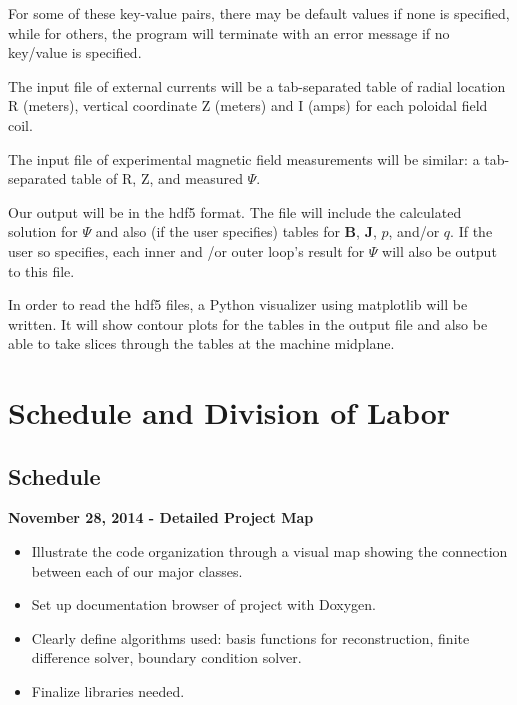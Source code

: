 \documentclass[paper=letter, fontsize=11pt]{scrartcl} %
\begin{document}
For some of these key-value pairs, there may be default values if none is specified, while for others, the program will terminate with an error message if no key/value is specified.

The input file of external currents will be a tab-separated table of radial location R (meters), vertical coordinate Z (meters) and I (amps) for each poloidal field coil.

The input file of experimental magnetic field measurements will be similar: a tab-separated table of R, Z, and measured $\Psi$.

Our output will be in the hdf5 format. The file will include the calculated solution for $\Psi$ and also (if the user specifies) tables for $\mathbf{B}$, $\mathbf{J}$, $p$, and/or $q$. If the user so specifies, each inner and /or outer loop's result for $\Psi$ will also be output to this file.

In order to read the hdf5 files, a Python visualizer using matplotlib will be written. It will show contour plots for the tables in the output file and also be able to take slices through the tables at the machine midplane.


\section{Schedule and Division of Labor}

\subsection{Schedule}

\textbf{November 28, 2014 - Detailed Project Map}
\begin{itemize}
\item Illustrate the code organization through a visual map showing the connection between each of our major classes. 
\item Set up documentation browser of project with Doxygen.
\item Clearly define algorithms used: basis functions for reconstruction, finite difference solver, boundary condition solver.
\item Finalize libraries needed.
\end{itemize}
\end{document}
